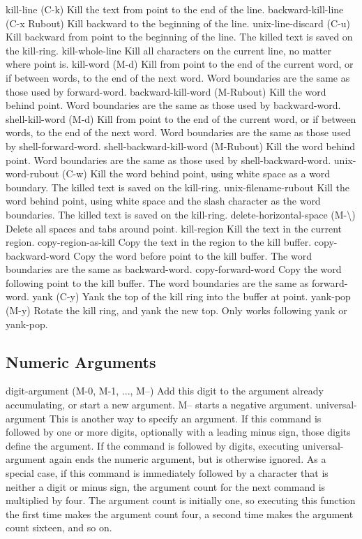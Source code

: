 kill-line (C-k)
Kill the text from point to the end of the line.
backward-kill-line (C-x Rubout)
Kill backward to the beginning of the line.
unix-line-discard (C-u)
Kill backward from point to the beginning of the line. The killed text is saved on the kill-ring.
kill-whole-line
Kill all characters on the current line, no matter where point is.
kill-word (M-d)
Kill from point to the end of the current word, or if between words, to the end of the next word. Word boundaries are the same as those used by forward-word.
backward-kill-word (M-Rubout)
Kill the word behind point. Word boundaries are the same as those used by backward-word.
shell-kill-word (M-d)
Kill from point to the end of the current word, or if between words, to the end of the next word. Word boundaries are the same as those used by shell-forward-word.
shell-backward-kill-word (M-Rubout)
Kill the word behind point. Word boundaries are the same as those used by shell-backward-word.
unix-word-rubout (C-w)
Kill the word behind point, using white space as a word boundary. The killed text is saved on the kill-ring.
unix-filename-rubout
Kill the word behind point, using white space and the slash character as the word boundaries. The killed text is saved on the kill-ring.
delete-horizontal-space (M-\textbackslash)
Delete all spaces and tabs around point.
kill-region
Kill the text in the current region.
copy-region-as-kill
Copy the text in the region to the kill buffer.
copy-backward-word
Copy the word before point to the kill buffer. The word boundaries are the same as backward-word.
copy-forward-word
Copy the word following point to the kill buffer. The word boundaries are the same as forward-word.
yank (C-y)
Yank the top of the kill ring into the buffer at point.
yank-pop (M-y)
Rotate the kill ring, and yank the new top. Only works following yank or yank-pop.
\subsection{Numeric Arguments}\label{sec:numericarguments}

digit-argument (M-0, M-1, ..., M--)
Add this digit to the argument already accumulating, or start a new argument. M-- starts a negative argument.
universal-argument
This is another way to specify an argument. If this command is followed by one or more digits, optionally with a leading minus sign, those digits define the argument. If the command is followed by digits, executing universal-argument again ends the numeric argument, but is otherwise ignored. As a special case, if this command is immediately followed by a character that is neither a digit or minus sign, the argument count for the next command is multiplied by four. The argument count is initially one, so executing this function the first time makes the argument count four, a second time makes the argument count sixteen, and so on.

